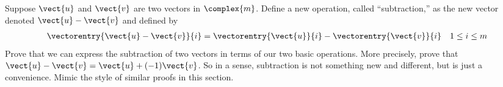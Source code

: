 Suppose $\vect{u}$ and $\vect{v}$ are two vectors in $\complex{m}$.  Define a new operation, called ``subtraction,'' as the new vector denoted $\vect{u}-\vect{v}$ and defined by
%
\begin{align*}
\vectorentry{\vect{u}-\vect{v}}{i}=\vectorentry{\vect{u}}{i}-\vectorentry{\vect{v}}{i}&&1\leq i\leq m
\end{align*}
%
Prove that we can express the subtraction of two vectors in terms of our two basic operations.  More precisely, prove that $\vect{u}-\vect{v}=\vect{u}+(-1)\vect{v}$.  So in a sense, subtraction is not something new and different, but is just a convenience.  Mimic the style of similar proofs in this section.